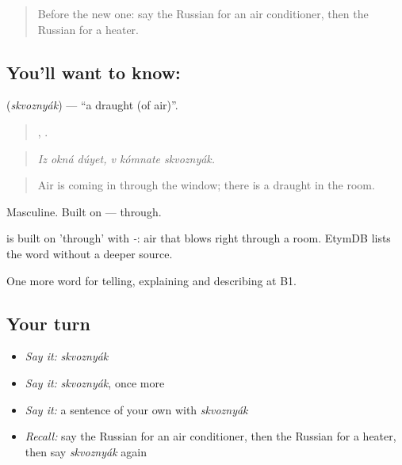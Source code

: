 \label{lesson:RU-C431-skvoznyak}



\begin{quote}
Before the new one: say the Russian for an air conditioner, then the Russian for a heater.
\end{quote}

\subsection*{You'll want to know: }
\textbf{} (\emph{skvoznyák}) — \textquotedblleft{}a draught (of air)\textquotedblright{}.

\begin{quote}
  ,   .
\end{quote}

\begin{quote}
\emph{Iz okná dúyet, v kómnate skvoznyák.}
\end{quote}

\begin{quote}
Air is coming in through the window; there is a draught in the room.
\end{quote}

Masculine. Built on \emph{} — through.

\begin{cousinweb}
\emph{} is built on \emph{} 'through' with \emph{-}: air that blows right through a room. EtymDB lists the word without a deeper source.
\end{cousinweb}

\begin{grammarlens}[title={What you've built}]
One more word for telling, explaining and describing at B1.
\end{grammarlens}

\subsection*{Your turn}
\begin{itemize}
\raggedright
  \item \emph{Say it:} \emph{skvoznyák}
  \item \emph{Say it:} \emph{skvoznyák}, once more
  \item \emph{Say it:} a sentence of your own with \emph{skvoznyák}
  \item \emph{Recall:} say the Russian for an air conditioner, then the Russian for a heater, then say \emph{skvoznyák} again
\end{itemize}

